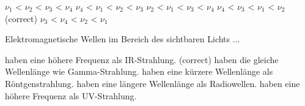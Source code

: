 \documentclass[11pt]{exam}
\begin{document}
\begin{questions}
\begin{choices}
	\choice \( \nu_1 \) < \( \nu_2 \) < \( \nu_3 \) < \( \nu_4 \)
	\choice \( \nu_4 \) < \( \nu_1 \) < \( \nu_2 \) < \( \nu_3 \)
	\choice \( \nu_2 \) < \( \nu_1 \) < \( \nu_3 \) < \( \nu_4 \)
	\choice \( \nu_4 \) < \( \nu_3 \) < \( \nu_1 \) < \( \nu_2 \) (correct)
	\choice \( \nu_3 \) < \( \nu_4 \) < \( \nu_2 \) < \( \nu_1 \)
\end{choices}

\vspace{3mm}\question Elektromagnetische Wellen im Bereich des sichtbaren Lichts ...

\begin{choices}
	\choice haben eine höhere Frequenz als IR-Strahlung. (correct)
	\choice haben die gleiche Wellenlänge wie Gamma-Strahlung.
	\choice haben eine kürzere Wellenlänge als Röntgenstrahlung.
	\choice haben eine längere Wellenlänge als Radiowellen.
	\choice haben eine höhere Frequenz als UV-Strahlung.
\end{choices}

\vspace{3mm}\end{questions}
\end{document}
